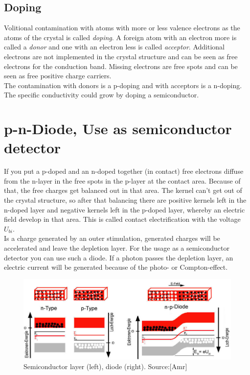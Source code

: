 \subsection*{Doping}
Volitional contamination with atoms with more or less valence electrons as the atoms of the crystal is called \textit{doping}. A foreign atom with an electron more is called a \textit{donor} and one with an electron less is called \textit{acceptor}. Additional electrons are not implemented in the crystal structure and can be seen as free electrons for the conduction band. Missing electrons are free spots and can be seen as free positive charge carriers.\\
The contamination with donors is a p-doping and with acceptors is a n-doping. The specific conductivity could grow by doping a semiconductor.
\section{p-n-Diode, Use as semiconductor detector}
If you put a p-doped and an n-doped together (in contact) free electrons diffuse from the n-layer in the free spots in the p-layer at the contact area. Because of that, the free charges get balanced out in that area. The kernel can't get out of the crystal structure, so after that balancing there are positive kernels left in the n-doped layer and negative kernels left in the p-doped layer, whereby an electric field develop in that area. This is called contact electrification with the voltage $\mathit{U_{bi}}$.\\
Is a charge generated by an outer stimulation, generated charges will be accelerated and leave the depletion layer. For the usage as a semiconductor detector you can use such a diode. If a photon passes the depletion layer, an electric current will be generated because of the photo- or Compton-effect.
\begin{figure}[h]
\begin{center}
\includegraphics[scale=0.5]{bilder/diode}
\caption{Semiconductor layer (left), diode (right). Source:[Amr] }
\label{fig:diode}
\end{center}
\end{figure}
